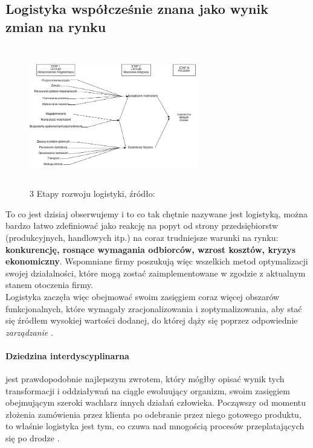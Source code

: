 	\subsection{Logistyka współcześnie znana jako wynik zmian na rynku}
		\begin{figure}[h]
			\centering
			\includegraphics[width=280px, height=230px]{images/etapy_rozwoju_logistyki}
			\caption[3 etapy rozwoju logistyki]{
				3 Etapy rozwoju logistyki, źródło: \cite{logityka_w_przedsiebiorstwie_sarsjusz_wolski_skowronek}
			}
		\end{figure}
		To co jest dzisiaj obserwujemy i to co tak chętnie nazywane jest logistyką, 
		można bardzo łatwo zdefiniować jako reakcję na popyt od
		strony przedsiębiorstw (produkcyjnych, handlowych itp.) na coraz trudniejsze warunki na
		rynku: \textbf{konkurencję, rosnące wymagania odbiorców, wzrost kosztów, kryzys ekonomiczny}.
		Wspomniane firmy poszukują więc wszelkich metod optymalizacji swojej działalności, 
		które mogą zostać zaimplementowane w zgodzie z aktualnym stanem otoczenia firmy.\\
		
		Logistyka zaczęła więc obejmować swoim zasięgiem coraz więcej obszarów funkcjonalnych, które
		wymagały zracjonalizowania i zoptymalizowania, aby stać się źródłem wysokiej wartości dodanej, do której
		dąży się poprzez odpowiednie \emph{zarządzanie} \cite{logistyka_jako_dziedzina_wiedzy_cz1}.		
		
		\paragraph{Dziedzina interdyscyplinarna} jest prawdopodobnie najlepszym zwrotem, 
		który mógłby opisać wynik tych transformacji i oddziaływań na ciągle ewoluujący organizm, swoim
		zasięgiem obejmującym szeroki wachlarz innych działań człowieka. Począwszy od momentu złożenia
		zamówienia przez klienta po odebranie przez niego gotowego produktu, to właśnie logistyka jest
		tym, co czuwa nad mnogością procesów przeplatających się po drodze \cite{logistyka_jako_dziedzina_wiedzy_cz2}.	
		
